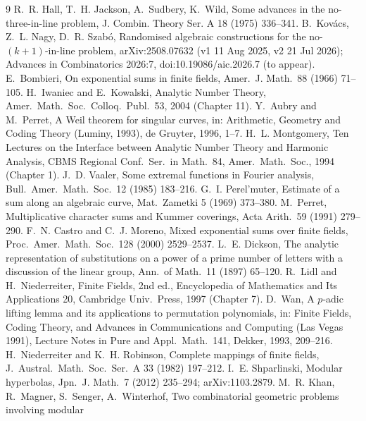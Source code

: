 \documentclass[11pt]{article}
\theoremstyle{remark}
\begin{document}


\begin{thebibliography}{9}
 R.~R. Hall, T.~H. Jackson, A.~Sudbery, K.~Wild, Some advances in the no-three-in-line problem,
 J. Combin. Theory Ser. A 18 (1975) 336--341.
 B.~Kov\'acs, Z.~L. Nagy, D.~R. Szab\'o, Randomised algebraic constructions for the no-$(k+1)$-in-line
 problem, arXiv:2508.07632 (v1 11 Aug 2025, v2 21 Jul 2026); Advances in Combinatorics 2026:7, doi:10.19086/aic.2026.7
 (to appear).
 E.~Bombieri, On exponential sums in finite fields, Amer.\ J. Math.\ 88 (1966) 71--105.
 H.~Iwaniec and E.~Kowalski, Analytic Number Theory, Amer.\ Math.\ Soc.\ Colloq.\ Publ.\ 53, 2004 (Chapter 11).
 Y.~Aubry and M.~Perret, A Weil theorem for singular curves, in: Arithmetic, Geometry and Coding Theory
 (Luminy, 1993), de Gruyter, 1996, 1--7.
 H.~L. Montgomery, Ten Lectures on the Interface between Analytic Number Theory and Harmonic Analysis,
 CBMS Regional Conf.\ Ser.\ in Math.\ 84, Amer.\ Math.\ Soc., 1994 (Chapter 1).
 J.~D. Vaaler, Some extremal functions in Fourier analysis, Bull.\ Amer.\ Math.\ Soc.\ 12 (1985) 183--216.
 G.~I. Perel'muter, Estimate of a sum along an algebraic curve, Mat.\ Zametki 5 (1969) 373--380.
 M.~Perret, Multiplicative character sums and Kummer coverings, Acta Arith.\ 59 (1991) 279--290.
 F.~N. Castro and C.~J. Moreno, Mixed exponential sums over finite fields, Proc.\ Amer.\ Math.\ Soc.\ 128 (2000) 2529--2537.
 L.~E. Dickson, The analytic representation of substitutions on a power of a prime number of letters with a discussion of
 the linear group, Ann.\ of Math.\ 11 (1897) 65--120.
 R.~Lidl and H.~Niederreiter, Finite Fields, 2nd ed., Encyclopedia of Mathematics and Its Applications 20,
 Cambridge Univ.\ Press, 1997 (Chapter 7).
 D.~Wan, A $p$-adic lifting lemma and its applications to permutation polynomials, in: Finite Fields, Coding Theory, and Advances in
 Communications and Computing (Las Vegas 1991), Lecture Notes in Pure and Appl.\ Math.\ 141, Dekker, 1993, 209--216.
 H.~Niederreiter and K.~H. Robinson, Complete mappings of finite fields, J.\ Austral.\ Math.\ Soc.\ Ser.\ A 33 (1982) 197--212.
 I.~E. Shparlinski, Modular hyperbolas, Jpn.\ J. Math.\ 7 (2012) 235--294; arXiv:1103.2879.
 M.~R. Khan, R.~Magner, S.~Senger, A.~Winterhof, Two combinatorial geometric problems involving modular

\end{thebibliography}
\end{document}
